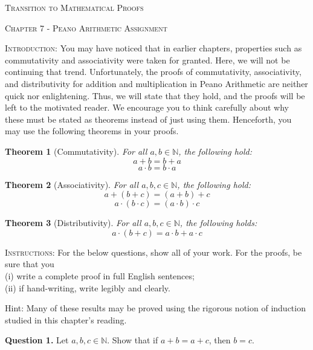 \documentclass[10pt]{report}
\newtheorem{theorem}{Theorem}
\begin{document}
\begin{center}\textsc{\Large Transition to Mathematical Proofs}

\textsc{\large Chapter 7 - Peano Arithmetic Assignment}

\bigskip

\end{center}



\noindent\textsc{Introduction:} You may have noticed that in earlier chapters, properties such as commutativity and associativity were taken for granted. Here, we will not be continuing that trend. Unfortunately, the proofs of commutativity, associativity, and distributivity for addition and multiplication in Peano Arithmetic are neither quick nor enlightening. Thus, we will state that they hold, and the proofs will be left to the motivated reader. We encourage you to think carefully about why these must be stated as theorems instead of just using them. Henceforth, you may use the following theorems in your proofs. 


\begin{theorem}[Commutativity]
For all $a, b \in \mathbb{N}$, the following hold:
$$
a+b = b+a
$$
$$
a\cdot b = b \cdot a
$$
\end{theorem}

\begin{theorem}[Associativity]
For all $a, b, c \in \mathbb{N}$, the following hold:
$$
a+(b+c) = (a+b)+c
$$
$$
a\cdot(b\cdot c) = (a\cdot b)\cdot c
$$
\end{theorem}

\begin{theorem}[Distributivity]
For all $a, b, c \in \mathbb{N}$, the following holds:
$$
a\cdot(b+c) = a\cdot b + a\cdot c
$$
\end{theorem}

\bigskip

\noindent\textsc{Instructions:}  For the below questions, show all of your work.  For the proofs, be sure that you \\
\noindent
(i) write a complete proof in full English sentences; \\
(ii) if hand-writing, write legibly and clearly.

\bigskip

\noindent Hint: Many of these results may be proved using the rigorous notion of induction studied in this chapter's reading. 

\bigskip

\noindent\textbf{Question 1.}  Let $a, b, c \in \mathbb{N}$.  Show that if $a+b = a+c$, then $b=c$. 
\end{document}
